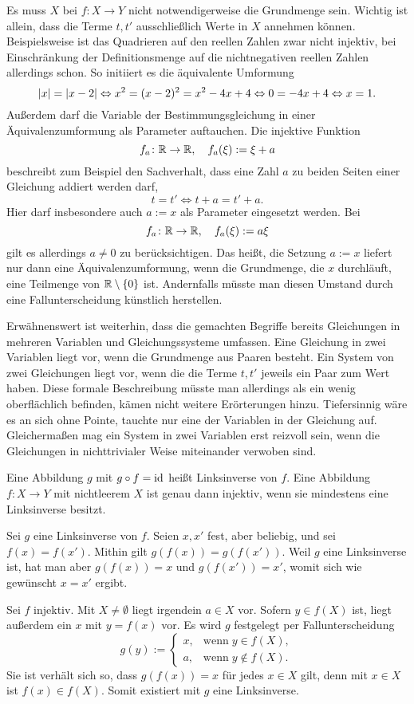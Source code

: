 Es muss $X$ bei $f\colon X\to Y$ nicht notwendigerweise die Grundmenge
sein. Wichtig ist allein, dass die Terme $t,t'$ ausschließlich Werte in
$X$ annehmen können. Beispielsweise ist das Quadrieren auf den reellen
Zahlen zwar nicht injektiv, bei Einschränkung der Definitionsmenge auf
die nichtnegativen reellen Zahlen allerdings schon. So initiiert es
die äquivalente Umformung%
\[|x| = |x-2| \Leftrightarrow x^2 = (x-2)^2 = x^2-4x+4 \Leftrightarrow
0 = -4x+4 \Leftrightarrow x = 1.\]
Außerdem darf die Variable der Bestimmungsgleichung in einer
Äquivalenzumformung als Parameter auftauchen. Die injektive Funktion%
\[f_a\colon\mathbb R\to\mathbb R,\quad f_a(\xi) := \xi + a\]
beschreibt zum Beispiel den Sachverhalt, dass eine Zahl $a$ zu beiden
Seiten einer Gleichung addiert werden darf,%
\[t = t' \iff t + a = t' + a.\]
Hier darf insbesondere auch $a:=x$ als Parameter eingesetzt werden. Bei%
\[f_a\colon\mathbb R\to\mathbb R,\quad f_a(\xi) := a\xi\]
gilt es allerdings $a\ne 0$ zu berücksichtigen. Das heißt, die Setzung
$a:=x$ liefert nur dann eine Äquivalenzumformung, wenn die Grundmenge,
die $x$ durchläuft, eine Teilmenge von $\mathbb R\setminus\{0\}$ ist. Andernfalls
müsste man diesen Umstand durch eine Fallunterscheidung künstlich herstellen.

Erwähnenswert ist weiterhin, dass die gemachten Begriffe bereits
Gleichungen in mehreren Variablen und Gleichungssysteme%
 umfassen. Eine Gleichung in zwei Variablen
liegt vor, wenn die Grundmenge aus Paaren besteht. Ein System von zwei
Gleichungen liegt vor, wenn die die Terme $t,t'$ jeweils ein Paar zum
Wert haben. Diese formale Beschreibung müsste man allerdings als ein
wenig oberflächlich befinden, kämen nicht weitere Erörterungen hinzu.
Tiefersinnig wäre es an sich ohne Pointe, tauchte nur eine der Variablen in
der Gleichung auf. Gleichermaßen mag ein System in zwei Variablen
erst reizvoll sein, wenn die Gleichungen in nichttrivialer Weise
miteinander verwoben sind.

\begin{Satz}
Eine Abbildung $g$ mit $g\circ f = \operatorname{id}$ heißt Linksinverse%
 von $f$. Eine Abbildung $f\colon X\to Y$ mit
nichtleerem $X$ ist genau dann injektiv, wenn sie mindestens eine
Linksinverse besitzt.
\end{Satz}
\begin{Beweis}
Sei $g$ eine Linksinverse von $f$. Seien $x,x'$ fest, aber beliebig,
und sei $f(x)=f(x')$. Mithin gilt $g(f(x))=g(f(x'))$. Weil $g$ eine
Linksinverse ist, hat man aber $g(f(x))=x$ und $g(f(x'))=x'$, womit
sich wie gewünscht $x=x'$ ergibt.

Sei $f$ injektiv. Mit $X\ne\emptyset$ liegt irgendein $a\in X$ vor.
Sofern $y\in f(X)$ ist, liegt außerdem ein $x$ mit $y=f(x)$ vor.
Es wird $g$ festgelegt per Fallunterscheidung
\[g(y) := \begin{cases}
x, & \text{wenn}\;y\in f(X),\\
a, & \text{wenn}\;y\notin f(X).
\end{cases}\]
Sie ist verhält sich so, dass $g(f(x))=x$ für jedes $x\in X$ gilt,
denn mit $x\in X$ ist $f(x)\in f(X)$. Somit existiert mit $g$ eine
Linksinverse.\,\qedsymbol
\end{Beweis}

